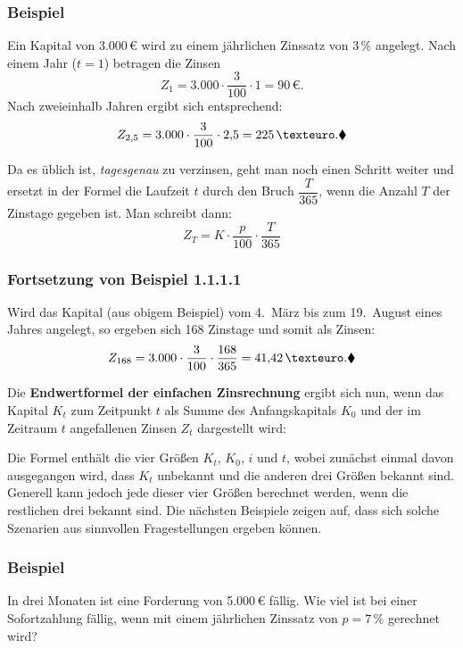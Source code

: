 \subsubsection{Beispiel}

Ein Kapital von 3.000\,€ wird zu einem jährlichen Zinssatz von 3\,\% angelegt. Nach einem Jahr ($t = 1$) betragen die Zinsen
\[ Z_1 = 3.000 \cdot \frac{3}{100} \cdot 1 = 90\,€ . \]
Nach zweieinhalb Jahren ergibt sich entsprechend:
\[ Z_{2{,}5} = 3.000 \cdot \frac{3}{100} \cdot 2{,}5 = 225\,€ .\beispielende \]

Da es üblich ist, \emph{tagesgenau} zu verzinsen, geht man noch einen Schritt weiter und ersetzt in der Formel die Laufzeit $t$ durch den Bruch $\dfrac{T}{365}$, wenn die Anzahl $T$ der Zinstage gegeben ist. Man schreibt dann:
\[ Z_T = K \cdot \frac{p}{100} \cdot \frac{T}{365} \]

\subsubsection{Fortsetzung von Beispiel 1.1.1.1}

Wird das Kapital (aus obigem Beispiel) vom 4.~März bis zum 19.~August eines Jahres angelegt, so ergeben sich 168 Zinstage und somit als Zinsen:
\[ Z_{168} = 3.000 \cdot \frac{3}{100} \cdot \frac{168}{365} = 41{,}42\,€ .\beispielende \]

Die \textbf{Endwertformel der einfachen Zinsrechnung} ergibt sich nun, wenn das Kapital $K_t$ zum Zeitpunkt $t$ als Summe des Anfangskapitals $K_0$ und der im Zeitraum $t$ angefallenen Zinsen $Z_t$ dargestellt wird:
\merkbox{\[ K_t = K_0 + K_0 \cdot i \cdot t = K_0 \cdot (1 + i \cdot t) \]}

Die Formel enthält die vier Größen $K_t$, $K_0$, $i$ und $t$, wobei zunächst einmal davon ausgegangen wird, dass $K_t$ unbekannt und die anderen drei Größen bekannt sind. Generell kann jedoch jede dieser vier Größen berechnet werden, wenn die restlichen drei bekannt sind. Die nächsten Beispiele zeigen auf, dass sich solche Szenarien aus sinnvollen Fragestellungen ergeben können.

\subsubsection{Beispiel}

In drei Monaten ist eine Forderung von 5.000\,€ fällig. Wie viel ist bei einer Sofortzahlung fällig, wenn mit einem jährlichen Zinssatz von $p = 7\,\%$ gerechnet wird?

